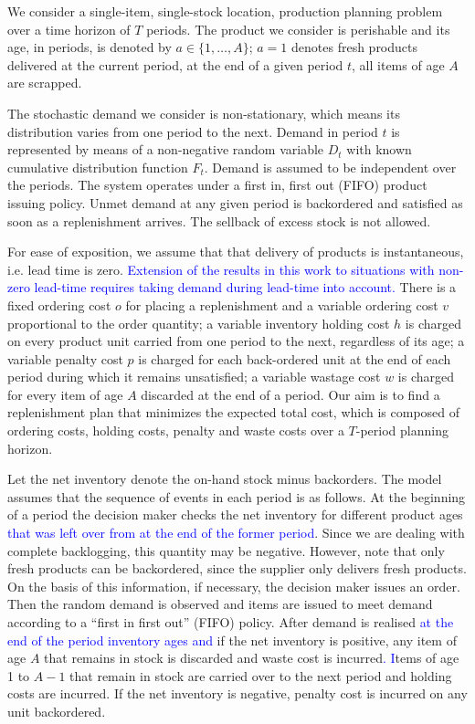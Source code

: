 \documentclass{tPRS2e}
\newcommand{\blue}{\textcolor{blue}}
\begin{document}
	We consider a single-item, single-stock location, production planning problem over a time horizon of $T$ periods. The product we consider is perishable and its age, in periods, is denoted by $a\in \{1,\ldots,A\}$; $a=1$ denotes fresh products delivered at the current period, at the end of a given period $t$, all items of age $A$ are scrapped.
	
	The stochastic demand we consider is non-stationary, which means its distribution varies from one period to the next. Demand in period $t$ is represented by means of a non-negative random variable $D_t$ with known cumulative distribution function $F_t$.  Demand is assumed to be independent over the periods. 	
	The system operates under a first in, first out (FIFO) product issuing policy. Unmet demand at any given period is backordered and satisfied as soon as a replenishment arrives. The sellback of excess stock is not allowed.
	
For ease of exposition, we assume that that delivery of products is instantaneous, i.e. lead time is zero. \blue{Extension of the results in this work to situations with non-zero lead-time requires taking demand during lead-time into account.}%
There is a fixed ordering cost $o$ for placing a replenishment and a variable ordering cost $v$ proportional to the order quantity; a variable inventory holding cost $h$ is charged on every product unit carried from one period to the next, regardless of its age; a variable penalty cost $p$ is charged for each back-ordered unit at the end of each period during which it remains unsatisfied; a variable wastage cost $w$ is charged for every item of age $A$ discarded at the end of a period.
Our aim is to find a replenishment plan that minimizes the expected total cost, which is composed of ordering costs, holding costs, penalty and waste costs over a $T$-period planning horizon.
	
	Let the net inventory denote the on-hand stock minus backorders. The model assumes that the sequence of events in each period is as follows. At the beginning of a period the decision maker checks the net inventory for different product ages \blue{that was left over from at the end of the former period}. Since we are dealing with complete backlogging, this quantity may be negative. However, note that only fresh products can be backordered, since the supplier only delivers fresh products. On the basis of this information, if necessary, the decision maker issues an order. Then the random demand is observed and items are issued to meet demand according to a ``first in first out'' (FIFO) policy. After demand is realised \blue{at the end of the period inventory ages and} if the net inventory is positive, any item of age $A$ that remains in stock is discarded and waste cost is incurred\blue{. I}tems of age 1 to $A-1$ that remain in stock are carried over to the next period and holding costs are incurred. If the net inventory is negative, penalty cost is incurred on any unit backordered.
\end{document}

